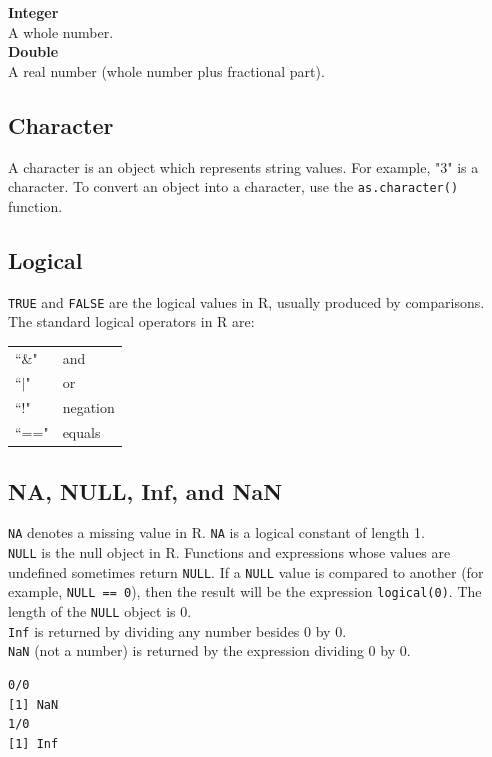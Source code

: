 \documentclass[11pt,letterpaper,fleqn]{report}
\begin{document}
\textbf{Integer}\\
A whole number. \\
\newline \textbf{Double}\\
A real number (whole number plus fractional part).\\

\subsection{Character}
A character is an object which represents string values. For example, "3" is a character. To convert an object into a character, use the \texttt{as.character()} function. 

\subsection{Logical}
\texttt{TRUE} and \texttt{FALSE} are the logical values in R, usually produced by comparisons. The standard logical operators in R are: 
\begin{tabular}{ll}
``\&"  & and \\
``$\mid$" & or \\
``!" & negation\\
``==" & equals
\end{tabular}

\subsection{NA, NULL, Inf, and NaN}
\texttt{NA} denotes a missing value in R. \texttt{NA} is a logical constant of length 1.\\

\texttt{NULL} is the null object in R. Functions and expressions whose values are undefined sometimes return \texttt{NULL}. If a \texttt{NULL} value is compared to another (for example, \texttt{NULL == 0}), then the result will be the expression \texttt{logical(0)}. The length of the \texttt{NULL} object is 0.\\
\texttt{Inf} is returned by dividing any number besides 0 by 0.\\
\texttt{NaN} (not a number) is returned by the expression dividing 0 by 0.\\

\begin{verbatim}
0/0
[1] NaN
1/0
[1] Inf
\end{verbatim}
\end{document}
